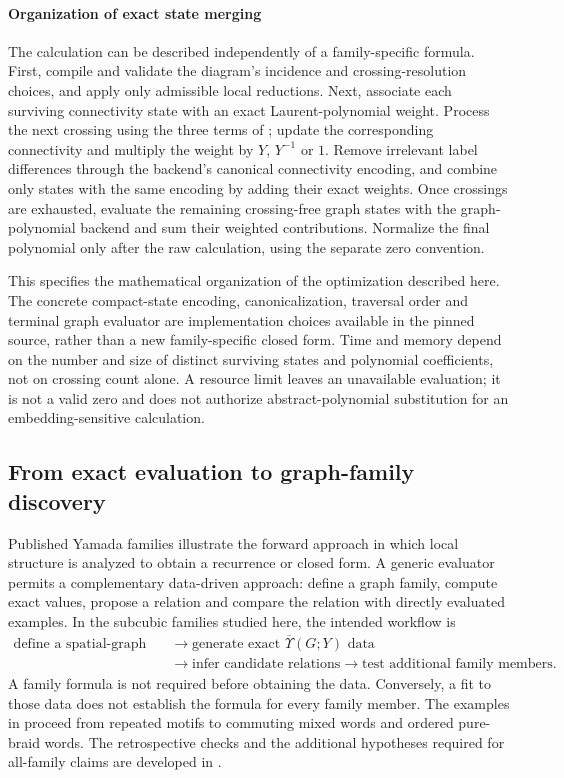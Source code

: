 \paragraph{Organization of exact state merging}
The calculation can be described independently of a family-specific formula. First, compile and validate the diagram's incidence and crossing-resolution choices, and apply only admissible local reductions. Next, associate each surviving connectivity state with an exact Laurent-polynomial weight. Process the next crossing using the three terms of ; update the corresponding connectivity and multiply the weight by $Y$, $Y^{-1}$ or $1$. Remove irrelevant label differences through the backend's canonical connectivity encoding, and combine only states with the same encoding by adding their exact weights. Once crossings are exhausted, evaluate the remaining crossing-free graph states with the graph-polynomial backend and sum their weighted contributions. Normalize the final polynomial only after the raw calculation, using the separate zero convention.

This specifies the mathematical organization of the optimization described here. The concrete compact-state encoding, canonicalization, traversal order and terminal graph evaluator are implementation choices available in the pinned source, rather than a new family-specific closed form. Time and memory depend on the number and size of distinct surviving states and polynomial coefficients, not on crossing count alone. A resource limit leaves an unavailable evaluation; it is not a valid zero and does not authorize abstract-polynomial substitution for an embedding-sensitive calculation.

\subsection{From exact evaluation to graph-family discovery}
\label{supp:yamada_discovery_bridge}
Published Yamada families illustrate the forward approach in which local structure is analyzed to obtain a recurrence or closed form. A generic evaluator permits a complementary data-driven approach: define a graph family, compute exact values, propose a relation and compare the relation with directly evaluated examples. In the subcubic families studied here, the intended workflow is
\begin{equation}
\boxed{\begin{aligned}
\text{define a spatial-graph family}&\longrightarrow\text{generate exact }\overline{\Upsilon}(G;Y)\text{ data}\\
&\longrightarrow\text{infer candidate relations}\longrightarrow\text{test additional family members}.
\end{aligned}}
\label{suppeq:yamada_discovery_bridge}
\end{equation}
A family formula is not required before obtaining the data. Conversely, a fit to those data does not establish the formula for every family member. The examples in  proceed from repeated motifs to commuting mixed words and ordered pure-braid words. The retrospective checks and the additional hypotheses required for all-family claims are developed in .
\FloatBarrier
